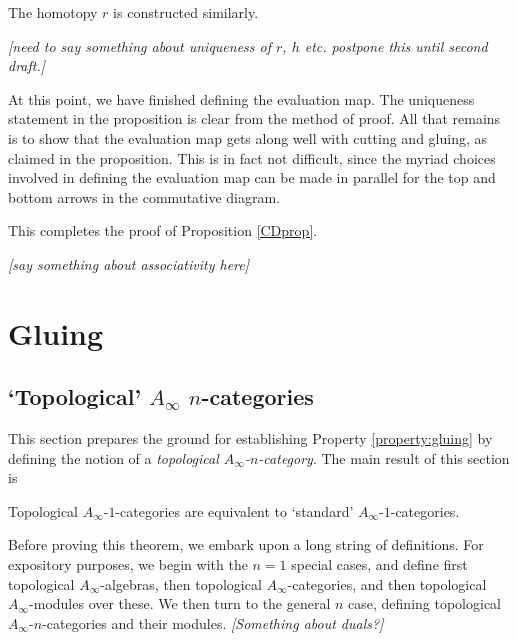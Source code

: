 \documentclass[11pt,leqno]{amsart}
\def\nn#1{{{\it \small [#1]}}}
\begin{document}
The homotopy $r$ is constructed similarly.

\nn{need to say something about uniqueness of $r$, $h$ etc.
postpone this until second draft.}

At this point, we have finished defining the evaluation map.
The uniqueness statement in the proposition is clear from the method of proof.
All that remains is to show that the evaluation map gets along well with cutting and gluing,
as claimed in the proposition.
This is in fact not difficult, since the myriad choices involved in defining the
evaluation map can be made in parallel for the top and bottom
arrows in the commutative diagram.

This completes the proof of Proposition \ref{CDprop}.

\medskip

\nn{say something about associativity here}

\section{Gluing}
\label{sec:gluing}%

\subsection{`Topological' $A_\infty$ $n$-categories}
\label{sec:topological-A-infty}%

This section prepares the ground for establishing Property \ref{property:gluing} by defining the notion of a \emph{topological $A_\infty$-$n$-category}.
The main result of this section is

\begin{thm}
Topological $A_\infty$-$1$-categories are equivalent to `standard'
$A_\infty$-$1$-categories.
\end{thm}

Before proving this theorem, we embark upon a long string of definitions. 
For expository purposes, we begin with the $n=1$ special cases, and define
first topological $A_\infty$-algebras, then topological $A_\infty$-categories, and then topological $A_\infty$-modules over these. We then turn
to the general $n$ case, defining topological $A_\infty$-$n$-categories and their modules.
\nn{Something about duals?}
\end{document}
